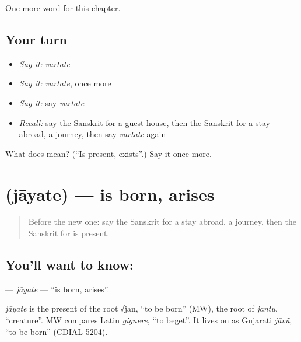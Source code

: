 \begin{grammarlens}[title={What you've built}]
One more word for this chapter.
\end{grammarlens}

\subsection*{Your turn}
\begin{itemize}
\raggedright
  \item \emph{Say it:} \emph{vartate}
  \item \emph{Say it:} \emph{vartate}, once more
  \item \emph{Say it:} say \emph{vartate}
  \item \emph{Recall:} say the Sanskrit for a guest house, then the Sanskrit for a stay abroad, a journey, then say \emph{vartate} again
\end{itemize}

\begin{tcolorbox}[breakable,colback=teal!4,colframe=teal!35!black,title={Before you move on}]
What does  mean? (\textquotedblleft{}Is present, exists\textquotedblright{}.) Say it once more.
\end{tcolorbox}
\section[\texorpdfstring{\sk{जायते} (jāyate)}{जायते (jāyate)}]{ (jāyate) — is born, arises}

\label{lesson:SA-C232-jayate}



\begin{quote}
Before the new one: say the Sanskrit for a stay abroad, a journey, then the Sanskrit for is present.
\end{quote}

\subsection*{You'll want to know: }
\textbf{} — \emph{jāyate} — \textquotedblleft{}is born, arises\textquotedblright{}.

\begin{cousinweb}
\emph{jāyate} is the present of the root √jan, \textquotedblleft{}to be born\textquotedblright{} (MW), the root of \emph{jantu}, \textquotedblleft{}creature\textquotedblright{}. MW compares Latin \emph{gignere}, \textquotedblleft{}to beget\textquotedblright{}. It lives on as Gujarati \emph{jāvũ}, \textquotedblleft{}to be born\textquotedblright{} (CDIAL 5204).
\end{cousinweb}

